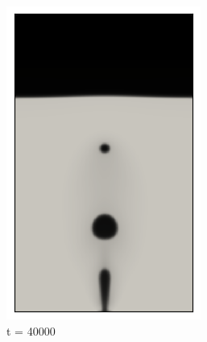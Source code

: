 \begin{figure}[H]
	\medskip
	\begin{subfigure}{0.25\textwidth}
		\includegraphics[width=\linewidth]{figs/cap4/cuda_bb_760_s40}
		\caption{t = 40000}
		\label{fig:7}
	\end{subfigure}\hfil
	\begin{subfigure}{0.25\textwidth}

\end{subfigure}
\end{figure}
